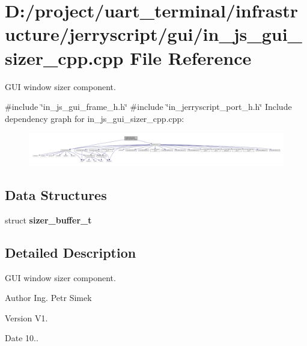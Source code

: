 \section{D\+:/project/uart\+\_\+terminal/infrastructure/jerryscript/gui/in\+\_\+js\+\_\+gui\+\_\+sizer\+\_\+cpp.cpp File Reference}
\label{in__js__gui__sizer__cpp_8cpp}


G\+UI window sizer component.  


{\ttfamily \#include \char`\"{}in\+\_\+js\+\_\+gui\+\_\+frame\+\_\+h.\+h\char`\"{}}\newline
{\ttfamily \#include \char`\"{}in\+\_\+jerryscript\+\_\+port\+\_\+h.\+h\char`\"{}}\newline
Include dependency graph for in\+\_\+js\+\_\+gui\+\_\+sizer\+\_\+cpp.\+cpp\+:
\nopagebreak
\begin{figure}[H]
\begin{center}
\leavevmode
\includegraphics[width=350pt]{in__js__gui__sizer__cpp_8cpp__incl}
\end{center}
\end{figure}
\subsection*{Data Structures}
\begin{DoxyCompactItemize}
\item 
struct \textbf{ sizer\+\_\+buffer\+\_\+t}
\end{DoxyCompactItemize}


\subsection{Detailed Description}
G\+UI window sizer component. 

\begin{DoxyAuthor}{Author}
Ing. Petr Simek 
\end{DoxyAuthor}
\begin{DoxyVersion}{Version}
V1. 
\end{DoxyVersion}
\begin{DoxyDate}{Date}
10.. 
\end{DoxyDate}
